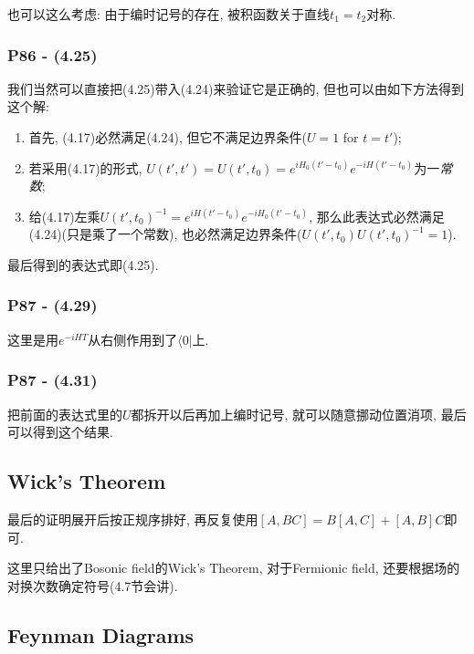 \documentclass[cn,hazy,blue,11pt,device=normal,chinesefont=founder]{elegantnote}
\begin{document}
\begin{remark}
  也可以这么考虑: 由于编时记号的存在, 被积函数关于直线$t_1 = t_2$对称. 
\end{remark}

\subsubsection{P86 - (4.25)}

我们当然可以直接把(4.25)带入(4.24)来验证它是正确的, 但也可以由如下方法得到这个解: 
\begin{enumerate}
  \item 首先, (4.17)必然满足(4.24), 但它不满足边界条件($U = 1$ for $t = t'$); 
  \item 若采用(4.17)的形式, $U(t', t') = U(t', t_0) = e^{iH_0(t'-t_0)}e^{-iH(t'-t_0)}$为一\textit{常数}; 
  \item 给(4.17)左乘$U(t', t_0)^{-1} = e^{iH(t'-t_0)}e^{-iH_0(t'-t_0)}$, 那么此表达式必然满足(4.24)(只是乘了一个常数), 也必然满足边界条件($U(t', t_0)U(t', t_0)^{-1} = 1$). 
\end{enumerate}
最后得到的表达式即(4.25). 

\subsubsection{P87 - (4.29)}

这里是用$e^{-iHT}$从右侧作用到了$\langle 0|$上. 

\subsubsection{P87 - (4.31)}

把前面的表达式里的$U$都拆开以后再加上编时记号, 就可以随意挪动位置消项, 最后可以得到这个结果. 

\subsection{Wick's Theorem}

最后的证明展开后按正规序排好, 再反复使用$[A, BC] = B[A, C] + [A, B]C$即可. 

这里只给出了Bosonic field的Wick's Theorem, 对于Fermionic field, 还要根据场的对换次数确定符号(4.7节会讲). 

\subsection{Feynman Diagrams}
\end{document}

